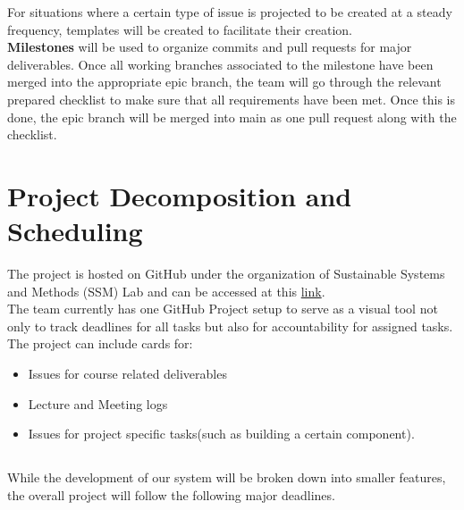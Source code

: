 \documentclass{article}
\begin{document}
\noindent
\hspace{\parindent}For situations where a certain type of issue is
projected to be created at a steady frequency, templates will be
created to facilitate their creation. \\

\noindent
\hspace{\parindent}\textbf{Milestones} will be used to organize commits and pull requests for major deliverables. Once all working branches associated to the milestone have been merged into the appropriate epic branch, the team will go through the relevant prepared checklist to make sure that all requirements have been met. Once this is done, the epic branch will be merged into main as one pull request along with the checklist. \\

\section{Project Decomposition and Scheduling}

\noindent
\hspace{\parindent}The project is hosted on GitHub under the organization of Sustainable Systems and Methods (SSM) Lab and can be accessed at this \href{https://github.com/orgs/ssm-lab/projects/2}{link}.\\

The team currently has one GitHub Project setup to serve as a visual
tool not only to track deadlines for all tasks but also for
accountability  for assigned tasks. The project can include cards for:
\begin{itemize}
  \item Issues for course related deliverables
  \item Lecture and Meeting logs
  \item Issues for project specific tasks(such as building a certain component).
\end{itemize}

\subsection*{\color{red}{Schedule}}
While the development of our system will be broken down into smaller
features, the overall project will follow the following major deadlines.
\end{document}

